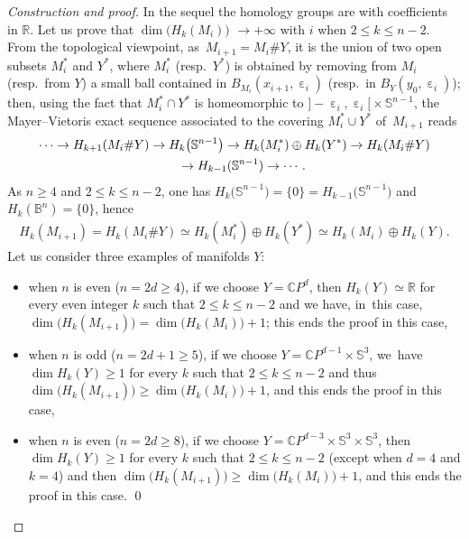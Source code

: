 \documentclass[10pt,a4paper]{amsart}
\numberwithin{equation}{section}
\newcommand{\R}{\mathbb{R}}
\newcommand{\C}{\mathbb{C}}
\newcommand{\f}{\rightarrow}
\newcommand{\e}{\operatorname{\varepsilon}}
\begin{document}
\begin{proof}[Construction and proof]
In the sequel the homology groups are with coefficients in $\R$. Let us prove that $\dim \big( H_k (M_i) \big)$ $\f + \infty$ with $i$ when $ 2 \le k \le n-2$.
From the topological viewpoint, as~$M_{i+1} = M_i \# Y$, it is the union of two open subsets $M_i^*$ and $Y^*$, where $M_i^*$ (resp.\ $Y^*$) is
obtained
by removing from $M_i$ (resp.\ from $Y$) a small ball contained in $B_{M_i} (x_{i+1}, \e_i)$ (resp.\ in $B_Y (y_0, \e_i)$); then, using the fact that
$M_i^* \cap Y^*$ is homeomorphic to $]{-} \e_i, \e_i[{} \times \mathbb S^{n-1}$, the Mayer--Vietoris exact
sequence associated to the covering $M_i^*\cup Y^*$ of~$M_{i+1}$
reads
\begin{gather*}
\cdots \f H_{k+1} (M_i \# Y) \f H_k \big(\mathbb S^{n-1}\big) \f H_k ( M_i^*) \oplus H_k (Y^*) \f H_k (M_i \# Y)
\\ \hphantom{\cdots}
\f H_{k-1} (\mathbb S^{n-1})\f \cdots.
\end{gather*}
As $ n \ge 4$ and $2 \le k \le n-2$, one has $H_{k} \big(\mathbb S^{n-1}\big) =
\{0\} = H_{k-1} \big(\mathbb S^{n-1}\big)$ and $H_{k} (\mathbb B^{n}) = \{0\}$, hence
\begin{gather*}
H_k (M_{i+1}) = H_k (M_i \# Y) \simeq H_k ( M_i^*) \oplus H_k (Y^*) \simeq H_k ( M_i) \oplus H_k (Y).
\end{gather*}
Let us consider three examples of manifolds $Y$:

\begin{itemize}\itemsep=0pt
\item when $n$ is even ($n = 2 d \ge 4$), if we choose $Y = \C P^d$, then $H_k (Y) \simeq \R$ for every even integer $k$ such that $ 2 \le k \le n-2$ and
we have, in~this case,
$\dim \big( H_k (M_{i+1})\big) = \dim \big( H_k (M_{i})\big) + 1$; this ends the proof in this case,

\item when $n$ is odd ($n = 2 d + 1\ge 5$), if we choose $Y = \C P^{d-1} \times \mathbb S^3$, we~have $\dim H_k (Y) \ge 1 $ for every
$k$ such that $ 2 \le k \le n-2$ and thus
$\dim \big( H_k (M_{i+1})\big) \ge \dim \big( H_k (M_{i})\big) + 1$,
and this ends the proof in this case,

\item when $n$ is even ($n = 2 d \ge 8$), if we choose $Y = \C P^{d-3} \times \mathbb S^3 \times \mathbb S^3$, then $\dim H_k (Y) \ge 1 $ for
every $k$
such that $ 2 \le k \le n-2$ (except when $d = 4$ and $ k = 4$) and then $\dim \big( H_k (M_{i+1})\big) \ge \dim \big( H_k (M_{i})\big) + 1$, and this ends the proof in this case.
\hfill \qed
\end{itemize}\renewcommand{\qed}{}
\end{proof}
\end{document}
